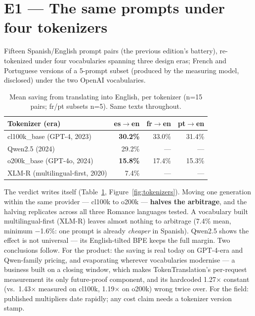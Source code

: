 \documentclass[10pt]{article}
\begin{document}
\section{E1 --- The same prompts under four tokenizers}
\label{sec:e1}

Fifteen Spanish/English prompt pairs (the previous edition's battery), re-tokenized under four vocabularies spanning three design eras; French and Portuguese versions of a 5-prompt subset (produced by the measuring model, disclosed) under the two OpenAI vocabularies.

\begin{table}[h]
\caption{Mean saving from translating into English, per tokenizer (n=15 pairs; fr/pt subsets n=5). Same texts throughout.}
\label{tab:tokenizers}
\begin{center}
\begin{tabular}{lrrr}
\toprule
\bf Tokenizer (era) & \bf es$\to$en & \bf fr$\to$en & \bf pt$\to$en \\
\midrule
cl100k\_base (GPT-4, 2023) & \bf 30.2\% & 33.0\% & 31.4\% \\
Qwen2.5 (2024) & 29.2\% & --- & --- \\
o200k\_base (GPT-4o, 2024) & \bf 15.8\% & 17.4\% & 15.3\% \\
XLM-R (multilingual-first, 2020) & 7.4\% & --- & --- \\
\bottomrule
\end{tabular}
\end{center}
\end{table}

The verdict writes itself (Table~\ref{tab:tokenizers}, Figure~\ref{fig:tokenizers}). Moving one generation within the same provider --- cl100k to o200k --- \textbf{halves the arbitrage}, and the halving replicates across all three Romance languages tested. A vocabulary built multilingual-first (XLM-R) leaves almost nothing to arbitrage (7.4\% mean, minimum $-$1.6\%: one prompt is already \emph{cheaper} in Spanish). Qwen2.5 shows the effect is not universal --- its English-tilted BPE keeps the full margin. Two conclusions follow. For the product: the saving is real today on GPT-4-era and Qwen-family pricing, and evaporating wherever vocabularies modernise --- a business built on a closing window, which makes TokenTranslation's per-request measurement its only future-proof component, and its hardcoded 1.27$\times$ constant (vs.\ 1.43$\times$ measured on cl100k, 1.19$\times$ on o200k) wrong twice over. For the field: published multipliers \citep{petrov2023unfair,ahia2023cost} date rapidly; any cost claim needs a tokenizer version stamp.
\end{document}
